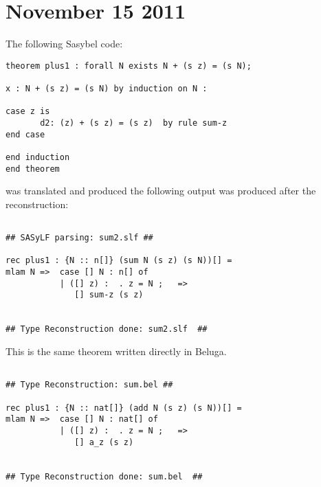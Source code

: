 \documentclass[12pt]{article}
\begin{document}
\section{November 15 2011}
The following \textmd{Sasybel} code:
\begin{verbatim}
theorem plus1 : forall N exists N + (s z) = (s N);

x : N + (s z) = (s N) by induction on N :

case z is
	   d2: (z) + (s z) = (s z) 	by rule sum-z
end case

end induction
end theorem

\end{verbatim}
was translated and produced the following output was produced after the reconstruction:
\begin{verbatim}

## SASyLF parsing: sum2.slf ##

rec plus1 : {N :: n[]} (sum N (s z) (s N))[] =
mlam N =>  case [] N : n[] of
           | ([] z) :  . z = N ;   =>
              [] sum-z (s z)


## Type Reconstruction done: sum2.slf  ##

\end{verbatim}
This is the same theorem written directly in \textmd{Beluga}.
\begin{verbatim}

## Type Reconstruction: sum.bel ##

rec plus1 : {N :: nat[]} (add N (s z) (s N))[] =
mlam N =>  case [] N : nat[] of
           | ([] z) :  . z = N ;   =>
              [] a_z (s z)


## Type Reconstruction done: sum.bel  ##

\end{verbatim}
\end{document}
